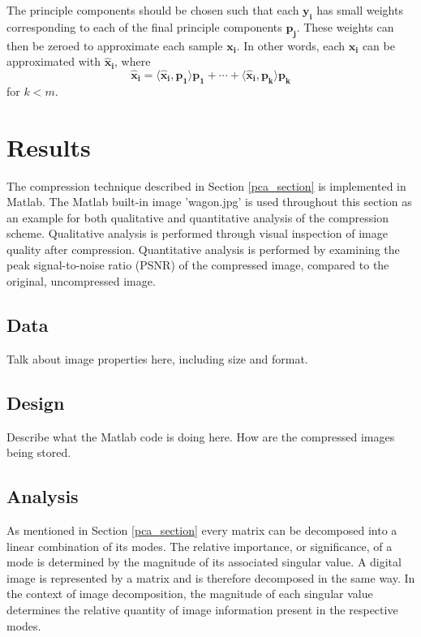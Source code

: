 \documentclass[conference]{IEEEtran}
\begin{document}
    	The principle components should be chosen such that each $\mathbf{y_i}$ has small weights corresponding to each of the final principle components $\mathbf{p_j}$. These weights can then be zeroed to approximate each sample $\mathbf{x_i}$. In other words, each $\mathbf{x_i}$ can be approximated with $\mathbf{\hat{x}_i}$, where
 	\begin{equation}
 		\mathbf{\hat{x}_i} = \langle \mathbf{\hat{x}_i}, \mathbf{p_1} \rangle \mathbf{p_1} + \cdots + \langle \mathbf{\hat{x}_i}, \mathbf{p_k} \rangle \mathbf{p_k}
 	\end{equation}   	
    	for $k < m$.
    	

    \section{Results}

    The compression technique described in Section \ref{pca_section} is implemented in Matlab. The Matlab built-in image 'wagon.jpg' is used throughout this section as an example for both qualitative and quantitative analysis of the compression scheme. Qualitative analysis is performed through visual inspection of image quality after compression. Quantitative analysis is performed by examining the peak signal-to-noise ratio (PSNR) of the compressed image, compared to the original, uncompressed image.

    \subsection{Data}
    Talk about image properties here, including size and format.

    \subsection{Design}
    Describe what the Matlab code is doing here.
    How are the compressed images being stored.

    \subsection{Analysis}
    As mentioned in Section \ref{pca_section} every matrix can be decomposed into a linear combination of its modes. The relative importance, or significance, of a mode is determined by the magnitude of its associated singular value. A digital image is represented by a matrix and is therefore decomposed in the same way. In the context of image decomposition, the magnitude of each singular value determines the relative quantity of image information present in the respective modes.
\end{document}
